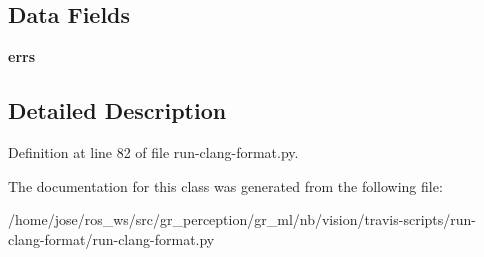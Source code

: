 \subsection*{Data Fields}
\begin{DoxyCompactItemize}
\item 
\mbox{\label{classrun-clang-format_1_1DiffError_af441d7a88a0405b0401e343a97863614}} 
{\bfseries errs}
\end{DoxyCompactItemize}


\subsection{Detailed Description}


Definition at line 82 of file run-\/clang-\/format.\+py.



The documentation for this class was generated from the following file\+:\begin{DoxyCompactItemize}
\item 
/home/jose/ros\+\_\+ws/src/gr\+\_\+perception/gr\+\_\+ml/nb/vision/travis-\/scripts/run-\/clang-\/format/run-\/clang-\/format.\+py\end{DoxyCompactItemize}
